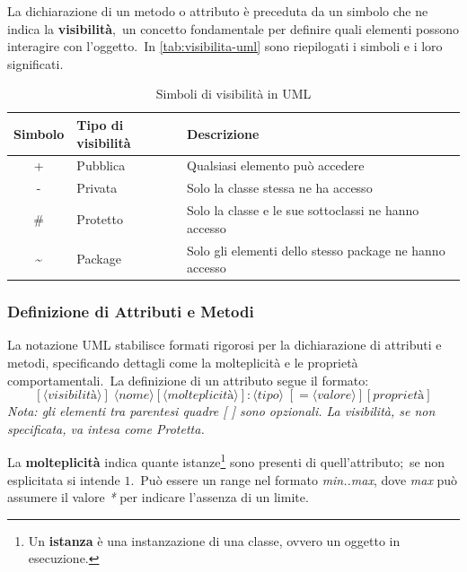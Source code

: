 La dichiarazione di un metodo o attributo è preceduta da un simbolo che ne indica la \textbf{visibilità},\
un concetto fondamentale per definire quali elementi possono interagire con l'oggetto.\
In \autoref{tab:visibilita-uml} sono riepilogati i simboli e i loro significati.\

\begin{table}[h!]
    \centering
    \caption{Simboli di visibilità in UML}
    \label{tab:visibilita-uml}
    \begin{tabular}{c l p{8cm}}
        \toprule
        \textbf{Simbolo} & \textbf{Tipo di visibilità} & \textbf{Descrizione}                                    \\
        \midrule
        +                & Pubblica                    & Qualsiasi elemento può accedere                         \\
        -                & Privata                     & Solo la classe stessa ne ha accesso                     \\
        \#               & Protetto                    & Solo la classe e le sue sottoclassi ne hanno accesso    \\
        \textasciitilde  & Package                     & Solo gli elementi dello stesso package ne hanno accesso \\
        \bottomrule
    \end{tabular}
\end{table}

\subsubsection{Definizione di Attributi e Metodi}

La notazione UML stabilisce formati rigorosi per la dichiarazione di attributi e metodi, specificando dettagli come la molteplicità e le proprietà comportamentali.\
La definizione di un attributo segue il formato:
\[
    [\langle \textit{visibilità} \rangle] \;
    \langle \textit{nome} \rangle [\langle \textit{molteplicità} \rangle]: \langle \textit{tipo} \rangle \;
    [= \langle \textit{valore} \rangle][{\textit{proprietà}}]
\]
\textit{Nota: gli elementi tra parentesi quadre [ ] sono opzionali. La visibilità, se non specificata, va intesa come Protetta.}

La \textbf{molteplicità} indica quante istanze\footnote{Un \textbf{istanza} è una instanzazione di una classe, ovvero un oggetto in esecuzione.} sono presenti di quell'attributo;\
se non esplicitata si intende $1$.\
Può essere un range nel formato \textit{min..max}, dove \textit{max} può assumere il valore \textit{*} per indicare l'assenza di un limite.

